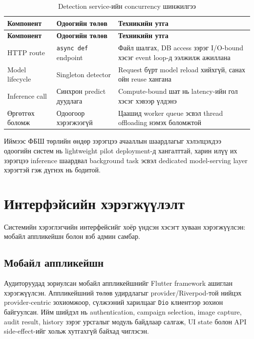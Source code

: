 \begin{longtable}{|p{3.8cm}|p{3.9cm}|p{4.9cm}|}
\caption{Detection service-ийн concurrency шинжилгээ}
\label{tab:detection_concurrency_discussion} \\
\hline
\textbf{Компонент} & \textbf{Одоогийн төлөв} & \textbf{Техникийн утга} \\
\hline
\endfirsthead
\hline
\textbf{Компонент} & \textbf{Одоогийн төлөв} & \textbf{Техникийн утга} \\
\hline
\endhead
\hline
\endfoot
HTTP route & \texttt{async def} endpoint & Файл шалгах, DB access зэрэг I/O-bound хэсэг event loop-д ээлжилж ажиллана \\
\hline
Model lifecycle & Singleton detector & Request бүрт model reload хийхгүй, санах ойн reuse хангана \\
\hline
Inference call & Синхрон predict дуудлага & Compute-bound шат нь latency-ийн гол хэсэг хэвээр үлдэнэ \\
\hline
Өргөтгөх боломж & Одоогоор хэрэгжээгүй & Цаашид worker queue эсвэл thread offloading нэмэх боломжтой \\
\hline
\end{longtable}

Иймээс ФБШ төрлийн өндөр зэрэгцээ ачааллын шаардлагыг хэлэлцэхдээ одоогийн систем нь lightweight pilot deployment-д хангалттай, харин илүү их зэрэгцээ inference шаардвал background task эсвэл dedicated model-serving layer хэрэгтэй гэж дүгнэх нь бодитой.

\section{Интерфэйсийн хэрэгжүүлэлт}

Системийн хэрэглэгчийн интерфейсийг хоёр үндсэн хэсэгт хуваан хэрэгжүүлсэн: мобайл аппликейшн болон вэб админ самбар.

\subsection{Мобайл аппликейшн}

Аудиторуудад зориулсан мобайл аппликейшнийг Flutter framework ашиглан хэрэгжүүлсэн. Аппликейшний төлөв удирдлагыг provider/Riverpod-той нийцэх provider-centric зохиомжоор, сүлжээний харилцааг \texttt{Dio} клиентээр зохион байгуулсан. Ийм шийдэл нь authentication, campaign selection, image capture, audit result, history зэрэг урсгалыг модуль байдлаар салгаж, UI state болон API side-effect-ийг хольж хутгахгүй байхад чиглэсэн.

